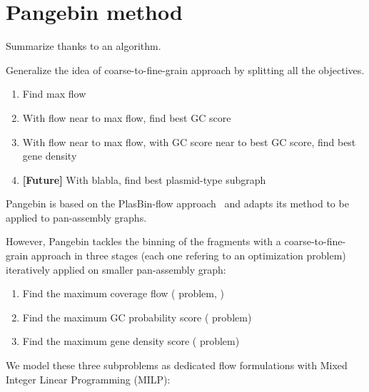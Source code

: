 \section{Pangebin method}

\begin{todobox}
    Summarize thanks to an algorithm.
\end{todobox}

\begin{todobox}
    Generalize the idea of coarse-to-fine-grain approach by splitting all the objectives.
    
    \begin{enumerate}[label=\roman*.]
        \item Find max flow
        \item With flow near to max flow, find best GC score
        \item With flow near to max flow, with GC score near to best GC score, find best gene density
        \item \textbf{[Future]} With blabla, find best plasmid-type subgraph
    \end{enumerate}
\end{todobox}

Pangebin is based on the PlasBin-flow approach~\cite{manePlasBinflowFlowbasedMILP2023} and adapts its method to be applied to pan-assembly graphs.

However, Pangebin tackles the binning of the fragments with a coarse-to-fine-grain approach in three stages (each one refering to an optimization problem) iteratively applied on smaller pan-assembly graph:

\begin{enumerate}[label=\roman*.]
    \item Find the maximum coverage flow (\MCF{} problem, ) 
    \item Find the maximum GC probability score (\MGC{} problem)
    \item Find the maximum gene density score (\MGD{} problem)
\end{enumerate}

We model these three subproblems as dedicated flow formulations with Mixed Integer Linear Programming (MILP):

